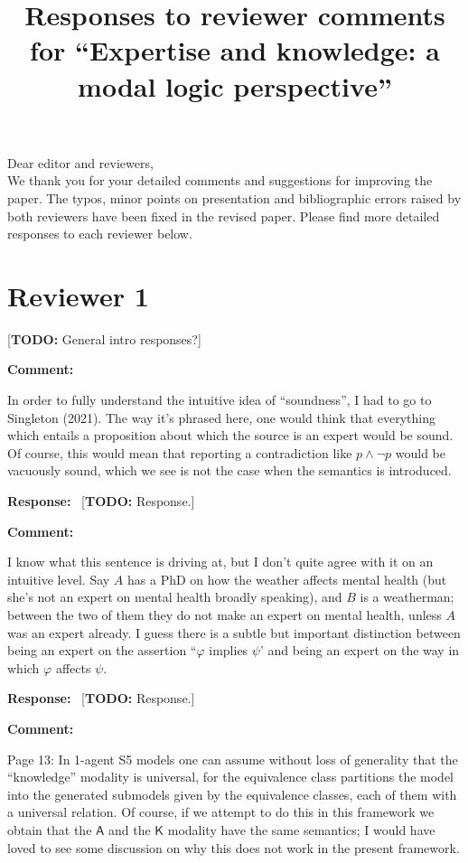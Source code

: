\documentclass[12pt]{article}
\title{%
    Responses to reviewer comments for ``Expertise and knowledge: a modal logic perspective''
}
\author{}
\date{}
\newcommand\todo[1]{{\color{red} [\textbf{TODO:} {#1}]}}
\newenvironment{comment}{
    \noindent\textbf{Comment:}\
    \em
}{\vspace{5mm}}
\newenvironment{response}{
    \noindent\textbf{Response:}\
}{\vspace{5mm}}
\renewcommand{\phi}{\varphi}
\newcommand{\A}{\mathsf{A}}
\newcommand{\K}{\mathsf{K}}
\begin{document}
\maketitle

Dear editor and reviewers,\\

We thank you for your detailed comments and suggestions for improving the
paper. The typos, minor points on presentation and bibliographic errors raised
by both reviewers have been fixed in the revised paper. Please find more
detailed responses to each reviewer below.

\section*{Reviewer 1}

\todo{General intro responses?}

\begin{comment}
    In order to fully understand the intuitive idea of ``soundness'', I had to
    go to Singleton (2021). The way it’s phrased here, one would think that
    everything which entails a proposition about which the source is an expert
    would be sound. Of course, this would mean that reporting a contradiction
    like $p \land \neg p$ would be vacuously sound, which we see is not the
    case when the semantics is introduced.
\end{comment}

\begin{response}
    \todo{Response.}
\end{response}

\begin{comment}
    I know what this sentence is driving at, but I don’t quite agree with it on
    an intuitive level. Say $A$ has a PhD on how the weather affects mental
    health (but she's not an expert on mental health broadly speaking), and $B$
    is a weatherman; between the two of them they do not make an expert on
    mental health, unless $A$ was an expert already.  I guess there is a subtle
    but important distinction between being an expert on the assertion ``$\phi$
    implies $\psi$’ and being an expert on the way in which $\phi$ affects
    $\psi$.
\end{comment}

\begin{response}
    \todo{Response.}
\end{response}

\begin{comment}
    Page 13: In 1-agent S5 models one can assume without loss of generality
    that the ``knowledge'' modality is universal, for the equivalence class
    partitions the model into the generated submodels given by the equivalence
    classes, each of them with a universal relation. Of course, if we attempt
    to do this in this framework we obtain that the $\A$ and the
    $\K$ modality have the same semantics; I would have loved to see
    some discussion on why this does not work in the present framework.
\end{comment}
\end{document}
